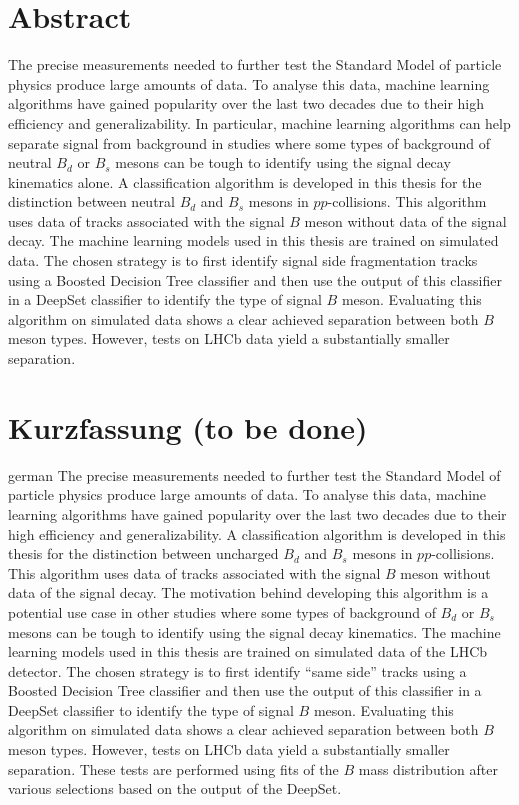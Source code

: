 \thispagestyle{plain}

\section*{Abstract} %
The precise measurements needed to further test the Standard Model of particle physics produce large amounts of data.
To analyse this data, machine learning algorithms have gained popularity over the last two decades due to their high efficiency and generalizability.
In particular, machine learning algorithms can help separate signal from background in studies where some types of background of neutral $B_d$ or $B_s$ mesons can be tough to identify using the signal decay kinematics alone.
A classification algorithm is developed in this thesis for the distinction between neutral $B_d$ and $B_s$ mesons in $pp$-collisions.
This algorithm uses data of tracks associated with the signal $B$ meson without data of the signal decay. 
The machine learning models used in this thesis are trained on simulated data. 
The chosen strategy is to first identify signal side fragmentation tracks using a Boosted Decision Tree classifier and then use the output of this classifier in a DeepSet classifier to identify the type of signal $B$ meson.
Evaluating this algorithm on simulated data shows a clear achieved separation between both $B$ meson types.
However, tests on LHCb data yield a substantially smaller separation.

\section*{Kurzfassung (to be done)} %
\begin{foreignlanguage}{german}
    The precise measurements needed to further test the Standard Model of particle physics produce large amounts of data.
    To analyse this data, machine learning algorithms have gained popularity over the last two decades due to their high efficiency and generalizability.
    A classification algorithm is developed in this thesis for the distinction between uncharged $B_d$ and $B_s$ mesons in $pp$-collisions.
    This algorithm uses data of tracks associated with the signal $B$ meson without data of the signal decay. 
    The motivation behind developing this algorithm is a potential use case in other studies where some types of background of $B_d$ or $B_s$ mesons can be tough to identify using the signal decay kinematics.
    The machine learning models used in this thesis are trained on simulated data of the LHCb detector. 
    The chosen strategy is to first identify \enquote{same side} tracks using a Boosted Decision Tree classifier and then use the output of this classifier in a DeepSet classifier to identify the type of signal $B$ meson.
    Evaluating this algorithm on simulated data shows a clear achieved separation between both $B$ meson types.
    However, tests on LHCb data yield a substantially smaller separation.
    These tests are performed using fits of the $B$ mass distribution after various selections based on the output of the DeepSet.
\end{foreignlanguage}
